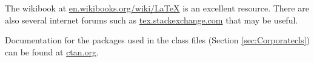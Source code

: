 The wikibook at \href{http://en.wikibooks.org/wiki/LaTeX}{en.wikibooks.org/wiki/LaTeX} is an excellent resource. There are also several internet forums such as \href{tex.stackexchange.com}{tex.stackexchange.com} that may be useful.

Documentation for the packages used in the class files (Section \ref{sec:Corporatecls}) can be found at \href{ctan.org}{ctan.org}.

